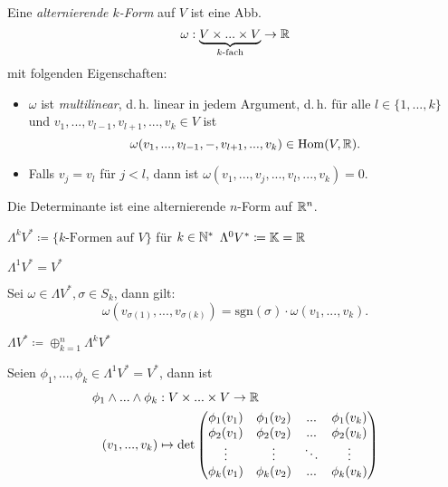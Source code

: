 \documentclass{cheat-sheet}
\begin{document}
\begin{defn}
  Eine \emph{alternierende $k$-Form} auf $V$ ist eine Abb.
  \[ \omega : \underbrace{V \times ... \times V}_{\text{$k$-fach}} \to \mathbb{R} \]
  mit folgenden Eigenschaften:
  \begin{itemize}
    \item $\omega$ ist \emph{multilinear}, d.\,h. linear in jedem Argument, d.\,h. für alle $l \in \{ 1, ..., k \}$ und $v_1, ..., v_{l-1}, v_{l+1}, ..., v_k \in V$ ist
    \[ \omega(v_1, ..., v_{l-1}, -, v_{l+1}, ..., v_k) \in \mathrm{Hom}(V, \mathbb{R}). \]
    \item Falls $v_j = v_l$ für $j < l$, dann ist $\omega(v_1, ..., v_j, ..., v_l, ..., v_k) = 0$.
  \end{itemize}
\end{defn}

\begin{bsp}
  Die Determinante ist eine alternierende $n$-Form auf $\mathbb{R}^n$.
\end{bsp}

\begin{nota}
  $\Lambda^k V^* \coloneqq \{ \text{$k$-Formen auf $V$} \}$ für $k \in \mathbb{N}^*$
  $\Lambda^0 V^* \coloneqq \mathbb{K} = \mathbb{R}$
\end{nota}

\begin{bem}
  $\Lambda^1 V^* = V^*$
\end{bem}

\begin{lem}
  Sei $\omega \in \Lambda V^*, \sigma \in S_k$, dann gilt:
  \[ \omega(v_{\sigma(1)}, ..., v_{\sigma(k)}) = \mathrm{sgn}(\sigma) \cdot \omega(v_1, ..., v_k). \]
\end{lem}

\begin{nota}
  $\Lambda V^* \coloneqq \oplus_{k=1}^n \Lambda^k V^*$
\end{nota}


\begin{defn}
  Seien $\phi_1, ..., \phi_k \in \Lambda^1 V^* = V^*$, dann ist
  \begin{align*}
    \phi_1 \wedge ... \wedge \phi_k &: V \times ... \times V \to \mathbb{R} \\
    (v_1, ..., v_k) &\mapsto \det \begin{pmatrix}
      \phi_1(v_1) & \phi_1(v_2) & ... & \phi_1(v_k) \\
      \phi_2(v_1) & \phi_2(v_2) & ... & \phi_2(v_k) \\
      \vdots & \vdots & \ddots & \vdots \\
      \phi_k(v_1) & \phi_k(v_2) & ... & \phi_k(v_k)
    \end{pmatrix}
  \end{align*}
\end{defn}
\end{document}
